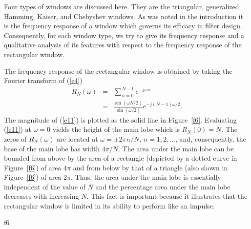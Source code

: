 Four types of windows are discussed
here.  They are the triangular, generalized Hamming,
Kaiser, and Chebyshev windows.  As was noted in the introduction it is the
frequency response of  a window
which governs its efficacy in filter design.  Consequently, for
each window type, we try to give its frequency response and a
qualitative analysis of its features with respect to the frequency 
response of the rectangular window.

	The frequency response of the rectangular window
 is obtained
by taking the Fourier transform of (\ref{e4})
%
\begin{eqnarray}
R_N(\omega) &=& \sum_{n=0}^{N-1}e^{-j\omega n} \\
            &=& \frac{\sin(\omega N/2)}{\sin(\omega/2)}e^{-j(N-1)\omega/2}.
\label{e11}
\end{eqnarray}
%
The magnitude of (\ref{e11}) is plotted as the solid line in Figure~\ref{f6}.
Evaluating (\ref{e11}) at $\omega=0$ yields the height of the 
main lobe which is $R_N(0)=N$.  The zeros of $R_N(\omega)$ are
located at $\omega=\pm2\pi n/N$, $n=1,2,\ldots$, and, consequently,
the base of the main lobe has width $4\pi/N$.  The area
under the main lobe can be bounded from above by the area of a
rectangle (depicted by a dotted curve in Figure~\ref{f6})
of area $4\pi$ and from
below by that of a triangle (also shown in Figure~\ref{f6}) of area $2\pi$.
Thus, the area under the main lobe is essentially independent
of the value of $N$ and the percentage area under the 
main lobe decreases with increasing $N$.  This fact is
important  because it illustrates 
that the rectangular window is limited
in its ability to perform like an impulse.

%

{f6}
%


